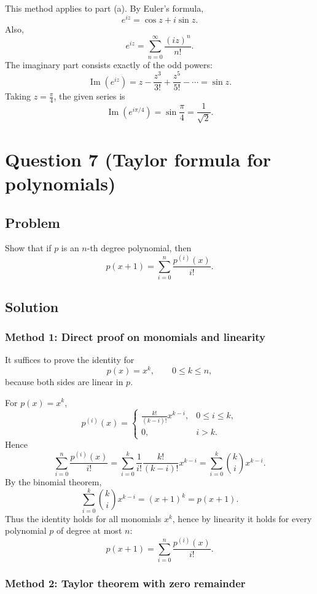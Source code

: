 \documentclass[12pt]{article}
\newcommand{\ds}{\displaystyle}
\begin{document}
This method applies to part (a). By Euler's formula,
\[
e^{iz}=\cos z+i\sin z.
\]
Also,
\[
e^{iz}
=
\sum_{n=0}^{\infty}\frac{(iz)^n}{n!}.
\]
The imaginary part consists exactly of the odd powers:
\[
\operatorname{Im}(e^{iz})
=
z-\frac{z^3}{3!}+\frac{z^5}{5!}-\cdots
=
\sin z.
\]
Taking \(z=\frac{\pi}{4}\), the given series is
\[
\operatorname{Im}\left(e^{i\pi/4}\right)
=
\sin\frac{\pi}{4}
=
\boxed{\frac1{\sqrt2}}.
\]


\newpage
\section{Question 7 (Taylor formula for polynomials)}

\subsection{Problem}
Show that if \(p\) is an \(n\)-th degree polynomial, then
\[
p(x+1)=\sum_{i=0}^{n}\frac{p^{(i)}(x)}{i!}.
\]


\bigskip
\subsection{Solution}

\subsubsection{Method 1: Direct proof on monomials and linearity}

It suffices to prove the identity for
\[
p(x)=x^k,\qquad 0\le k\le n,
\]
because both sides are linear in \(p\).

For \(p(x)=x^k\),
\[
p^{(i)}(x)=
\begin{cases}
\ds \frac{k!}{(k-i)!}x^{k-i}, & 0\le i\le k,\\[0.6em]
0, & i>k.
\end{cases}
\]
Hence
\[
\sum_{i=0}^{n}\frac{p^{(i)}(x)}{i!}
=
\sum_{i=0}^{k}
\frac{1}{i!}\frac{k!}{(k-i)!}x^{k-i}
=
\sum_{i=0}^{k}\binom{k}{i}x^{k-i}.
\]
By the binomial theorem,
\[
\sum_{i=0}^{k}\binom{k}{i}x^{k-i}
=
(x+1)^k
=
p(x+1).
\]
Thus the identity holds for all monomials \(x^k\), hence by linearity it holds for every
polynomial \(p\) of degree at most \(n\):
\[
\boxed{
p(x+1)=\sum_{i=0}^{n}\frac{p^{(i)}(x)}{i!}.
}
\]

\newpage
\subsubsection{Method 2: Taylor theorem with zero remainder}
\end{document}
